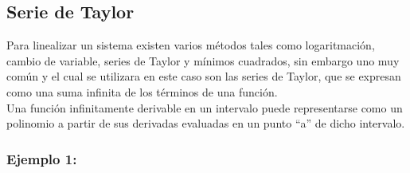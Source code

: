 \documentclass[a4paper,12pt,twoside]{proyectotanquesecci}
\begin{document}
\subsection{Serie de Taylor}

Para linealizar un sistema existen varios métodos tales como logaritmación, cambio de variable, series de Taylor y mínimos cuadrados, sin embargo uno muy común y el cual se utilizara en este caso son las series de Taylor, que se expresan como una suma infinita de los términos de una función.\\

Una función infinitamente derivable en un intervalo puede representarse como un polinomio a partir de sus derivadas evaluadas en un punto “a” de dicho intervalo.\\

\begin{equation}
\end{equation}

\subsubsection{Ejemplo 1:}

\end{document}
